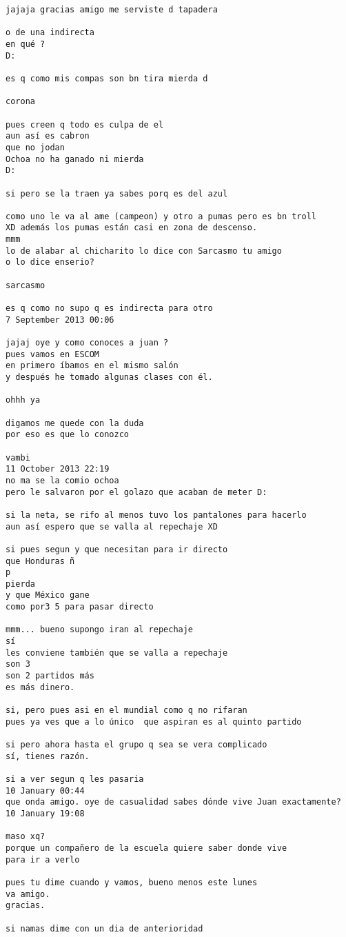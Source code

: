 \begin{verbatim}
jajaja gracias amigo me serviste d tapadera

o de una indirecta
en qué ?
D:

es q como mis compas son bn tira mierda d

corona

pues creen q todo es culpa de el
aun así es cabron
que no jodan
Ochoa no ha ganado ni mierda
D:

si pero se la traen ya sabes porq es del azul

como uno le va al ame (campeon) y otro a pumas pero es bn troll
XD además los pumas están casi en zona de descenso.
mmm
lo de alabar al chicharito lo dice con Sarcasmo tu amigo
o lo dice enserio?

sarcasmo

es q como no supo q es indirecta para otro
7 September 2013 00:06

jajaj oye y como conoces a juan ?
pues vamos en ESCOM
en primero íbamos en el mismo salón
y después he tomado algunas clases con él.

ohhh ya

digamos me quede con la duda
por eso es que lo conozco

vambi
11 October 2013 22:19
no ma se la comio ochoa
pero le salvaron por el golazo que acaban de meter D:

si la neta, se rifo al menos tuvo los pantalones para hacerlo
aun así espero que se valla al repechaje XD

si pues segun y que necesitan para ir directo
que Honduras ñ
p
pierda
y que México gane
como por3 5 para pasar directo

mmm... bueno supongo iran al repechaje
sí
les conviene también que se valla a repechaje
son 3
son 2 partidos más
es más dinero.

si, pero pues asi en el mundial como q no rifaran
pues ya ves que a lo único  que aspiran es al quinto partido

si pero ahora hasta el grupo q sea se vera complicado
sí, tienes razón.

si a ver segun q les pasaria
10 January 00:44
que onda amigo. oye de casualidad sabes dónde vive Juan exactamente?
10 January 19:08

maso xq?
porque un compañero de la escuela quiere saber donde vive
para ir a verlo

pues tu dime cuando y vamos, bueno menos este lunes
va amigo.
gracias.

si namas dime con un dia de anterioridad
\end{verbatim}
